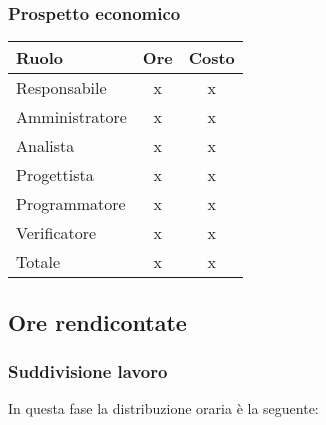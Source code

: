 {{{{{{{{{{{\subsubsection{Prospetto economico}\label{5.6.1.2}
\quad
\def\tabularxcolumn#1{m{#1}}
{	
	\begin{center}
		\renewcommand{\arraystretch}{1.4}
		\begin{tabularx}{7cm}{|X|c|c|}
			\hline
			\rowcolor{airforceblue}
			\textbf{Ruolo} & \textbf{Ore} & \textbf{Costo}\\
			\hline
			Responsabile & x & x\\
			\hline
			Amministratore & x & x\\
			\hline
			Analista & x & x\\
			\hline
			Progettista & x & x\\
			\hline
			Programmatore & x & x\\
			\hline
			Verificatore & x & x\\
			\hline
			Totale & x & x\\
			\hline
		\end{tabularx}
	\end{center}

\subsection{Ore rendicontate}\label{5.6.2}

\subsubsection{Suddivisione lavoro}\label{5.6.2.1}
In questa fase la distribuzione oraria è la seguente:
\quad
\def\tabularxcolumn#1{m{#1}}
{
	
}}}}}}}}}}}}}

